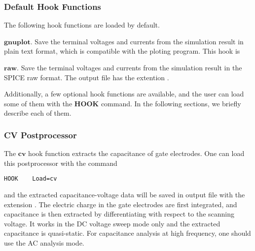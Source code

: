 \documentclass[oneside,12pt]{cgd_book}
\begin{document}
\subsubsection{Default Hook Functions}
The following hook functions are loaded by default.
\par
\begin{compactitem}
\item $\mathbf{gnuplot}$. Save the terminal voltages and currents from the simulation result
              in plain text format, which is compatible with the
 ploting program. This hook
              is
\par
\item $\mathbf{raw}$. Save the terminal voltages and currents from the simulation result in
              the SPICE raw format. The output file has the extention
.
\par
\end{compactitem}
Additionally, a few optional hook functions are available, and the user can load some of them with the
$\mathbf{HOOK}$ command. In the following sections, we briefly describe each of them.
\par
\subsubsection{CV Postprocessor}
The $\mathbf{cv}$ hook function extracts the capacitance of gate electrodes. One can load
          this postprocessor with the command
\begin{lstlisting}[style=GeniusCode]
HOOK    Load=cv
\end{lstlisting}
and the extracted capacitance-voltage data will be saved in output file with the extension
. The electric charge in the gate electrodes are first integrated, and capacitance is
          then extracted by differentiating with respect to the scanning voltage. It works in the DC voltage sweep mode
          only and the extracted capacitance is quasi-static. For capacitance analysis at high frequency, one should use
          the AC analysis mode.
\par
\end{document}
